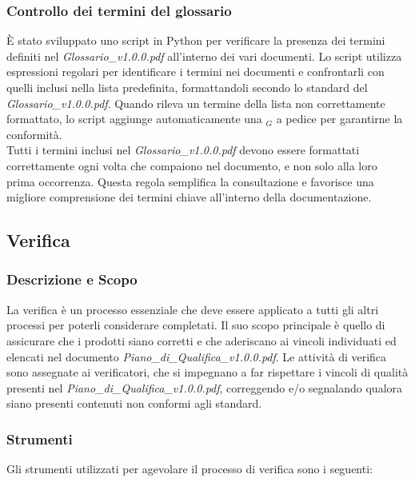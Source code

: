 \documentclass[10pt]{article}
\begin{document}
\begin{justify}
    \subsubsection{Controllo dei termini del glossario}
    È stato sviluppato uno script in Python per verificare la presenza dei termini definiti nel \textit{Glossario\_v1.0.0.pdf} all'interno dei vari documenti. Lo script utilizza espressioni regolari per identificare i termini nei documenti e confrontarli con quelli inclusi nella lista predefinita, formattandoli secondo lo standard del \textit{Glossario\_v1.0.0.pdf}. Quando rileva un termine della lista non correttamente formattato, lo script aggiunge automaticamente una $_G$ a pedice per garantirne la conformità.\\
    Tutti i termini inclusi nel \textit{Glossario\_v1.0.0.pdf} devono essere formattati correttamente ogni volta che compaiono nel documento, e non solo alla loro prima occorrenza. Questa regola semplifica la consultazione e favorisce una migliore comprensione dei termini chiave all'interno della documentazione.

    \subsection{Verifica}
    \label{verifica}
    \subsubsection{Descrizione e Scopo} 
    La verifica è un processo essenziale che deve essere applicato a tutti gli altri processi per poterli considerare completati. Il suo scopo principale è quello di assicurare che i prodotti siano corretti e che aderiscano ai vincoli individuati ed elencati nel documento \textit{Piano\_di\_Qualifica\_v1.0.0.pdf}. Le attività di verifica sono assegnate ai verificatori, che si impegnano a far rispettare i vincoli di qualità presenti nel \textit{Piano\_di\_Qualifica\_v1.0.0.pdf}, correggendo e/o segnalando qualora siano presenti contenuti non conformi agli standard.
    \subsubsection{Strumenti}
    Gli strumenti utilizzati per agevolare il processo di verifica sono i seguenti:

\end{justify}
\end{document}
